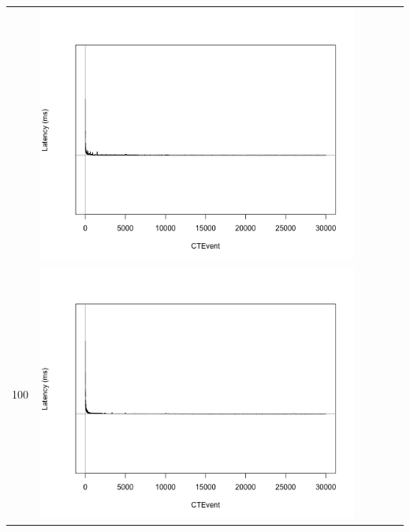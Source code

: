 \begin{table}[htbp]
{\begin{tabular}{l | ccccc}
\begin{minipage}{.15\textwidth}
    				\end{minipage}
    			   & \begin{minipage}{.15\textwidth}\vspace{2pt}     							
     			 	\includegraphics[width=\linewidth]{images/lat-log-triple/N6}
    				 \end{minipage}\\		
		100	   & \begin{minipage}{.15\textwidth}\vspace{2pt}     							
     			 	\includegraphics[width=\linewidth]{images/lat-log-triple/N3}
    				 \end{minipage}

\end{tabular}}
\end{table}
